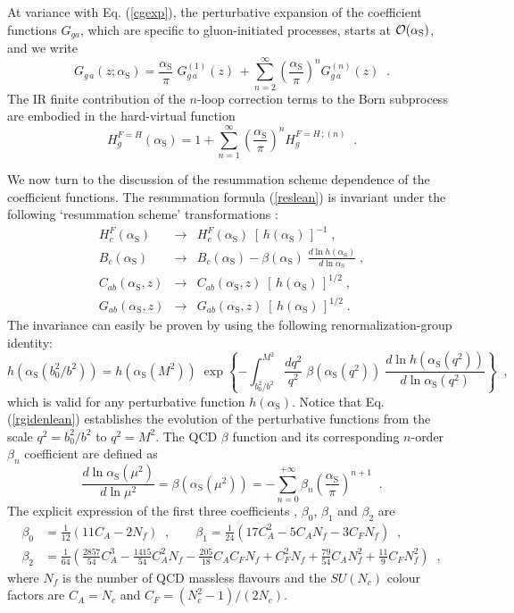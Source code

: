 \documentclass[12pt]{article}
\def\beeq{\begin{eqnarray}}
\def\eeeq{\end{eqnarray}}
\def\nn{\nonumber}
\newcommand\as{\alpha_{\mathrm{S}}}
\newcommand\f[2]{\frac{#1}{#2}}
\def\to{\rightarrow}
\begin{document}
At variance with Eq. (\ref{cgexp}), the perturbative expansion of the coefficient functions $G_{ga}$, which are specific to gluon-initiated processes, starts at ${\cal O}(\as)$, and we write \cite{Catani:2010pd,Catani:2013tia}
\begin{equation}
\label{gfexp}
G_{g \,a}(z;\as) = \f{\as}{\pi} \;G_{g \,a}^{(1)}(z) \,+
\sum_{n=2}^\infty \left( \frac{\as}{\pi} \right)^n G_{g \,a}^{(n)}(z) \;\;.
\end{equation}
The IR finite contribution of the $n$-loop correction terms to the Born subprocess are embodied in the hard-virtual function
\begin{equation}
\label{hexp}
H_g^{F=H}(\as) = 1+ \sum_{n=1}^\infty 
\left( \frac{\as}{\pi} \right)^n 
H_g^{F=H \,;(n)}
\;\;.
\end{equation} 

We now turn to the discussion of the resummation scheme dependence of the coefficient functions.
The resummation formula (\ref{reslean}) is invariant under the following `resummation scheme'  transformations \cite{Catani:2000vq}:
\beeq
H_c^{F}(\as) & \to & H_c^{F}(\as) \; \left[ \, h(\as) \, \right]^{-1}
\;, \nn \\
\label{restranf}
B_c(\as) & \to & B_c(\as) - \beta(\as) \;\frac{d\ln h(\as)}{d\ln \as} 
\;,\\
C_{ab}(\as,z) & \to & C_{ab}(\as,z) \;
\left[ \, h(\as) \, \right]^{1/2} \;,\nn\\
G_{ab}(\as,z) & \to & G_{ab}(\as,z) \;
\left[ \, h(\as) \, \right]^{1/2} \;. \nn
\eeeq
The invariance can easily be proven by using the following renormalization-group identity:
\begin{equation}
\label{rgidenlean}
h(\as(b_0^2/b^2)) = h(\as(M^2)) \; \exp \left\{ 
-\int_{b_0^2/b^2}^{M^2} \frac{dq^2}{q^2} 
\;\beta(\as(q^2)) \;\frac{d \ln h(\as(q^2))}{d \ln \as(q^2)} 
\right\} \;\;,
\end{equation}
which is valid for any perturbative function $h(\as)$. Notice that Eq. (\ref{rgidenlean}) establishes the evolution of the perturbative functions from the scale $q^{2}=b_0^2/b^2$ to $q^{2}=M^2$. The QCD $\beta$ function and its corresponding $n$-order $\beta_n$ coefficient are defined as
\begin{equation}
\label{rge}
\f{d \ln \as(\mu^2)}{d \ln \mu^2} = \beta(\as(\mu^2)) = 
- \sum_{n=0}^{+\infty} \beta_n \left( \f{\as}{\pi} \right)^{n+1}\;\;.
\end{equation}
The explicit expression of the first three coefficients \cite{Tarasov:1980au,Larin:1993tp}, $\beta_0$, $\beta_1$ and
$\beta_2$ are
\begin{align}
\beta_0 &= \frac{1}{12} \left( 11 C_A - 2 N_f \right) \;\;,
\quad\quad \beta_1=  \frac{1}{24} 
\left( 17 C_A^2 - 5 C_A N_f - 3 C_F N_f \right) \;\;,\nn\\
\beta_2 &= \frac{1}{64} \left( \f{2857}{54} C_A^3
- \f{1415}{54} C_A^2 N_f - \f{205}{18} C_A C_F N_f + C_F^2 N_f
+ \f{79}{54} C_A N_f^2 + \f{11}{9} C_F N_f^2 \right) \;\;,
\end{align}
where $N_f$ is the number of QCD massless flavours and the $SU(N_c)$ colour factors are $C_A=N_c$  and $C_F=(N_c^2-1)/(2N_c)$.
\end{document}

